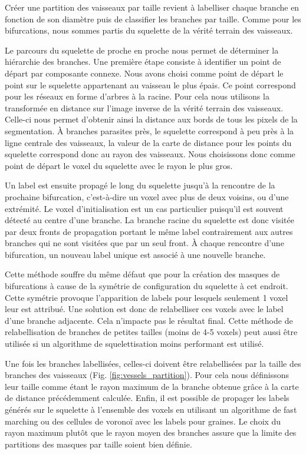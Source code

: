 Créer une partition des vaisseaux par taille revient à labelliser chaque branche en fonction de son diamètre puis de classifier les branches par taille. Comme pour les bifurcations, nous sommes partis du squelette de la vérité terrain des vaisseaux.

Le parcours du squelette de proche en proche nous permet de déterminer la hiérarchie des branches. Une première étape consiste à identifier un point de départ par composante connexe. Nous avons choisi comme point de départ le point sur le squelette appartenant au vaisseau le plus épais. Ce point correspond pour les réseaux en forme d'arbres à la racine. Pour cela nous utilisons la transformée en distance sur l'image inverse de la vérité terrain des vaisseaux. Celle-ci nous permet d'obtenir ainsi la distance aux bords de tous les pixels de la segmentation. À branches parasites près, le squelette correspond à peu près à la ligne centrale des vaisseaux, la valeur de la carte de distance pour les points du squelette correspond donc au rayon des vaisseaux. Nous choisissons donc comme point de départ le voxel du squelette avec le rayon le plus gros.

Un label est ensuite propagé le long du squelette jusqu'à la rencontre de la prochaine bifurcation, c'est-à-dire un voxel avec plus de deux voisins, ou d'une extrémité. Le voxel d'initialisation est un cas particulier puisqu'il est souvent détecté au centre d'une branche. La branche racine du squelette est donc visitée par deux fronts de propagation portant le même label contrairement aux autres branches qui ne sont visitées que par un seul front. À chaque rencontre d'une bifurcation, un nouveau label unique est associé à une nouvelle branche.

Cette méthode souffre du même défaut que pour la création des masques de bifurcations à cause de la symétrie de configuration du squelette à cet endroit. Cette symétrie provoque l'apparition de labels pour lesquels seulement 1 voxel leur est attribué. Une solution est donc de relabelliser ces voxels avec le label d'une branche adjacente. Cela n'impacte pas le résultat final. Cette méthode de relabellisation de branches de petites tailles (moins de 4-5 voxels) peut aussi être utilisée si un algorithme de squelettisation moins performant est utilisé.

Une fois les branches labellisées, celles-ci doivent être relabellisées par la taille des branches des vaisseaux (Fig. \ref{fig:vessels_partition}). Pour cela nous définissons leur taille comme étant le rayon maximum de la branche obtenue grâce à la carte de distance précédemment calculée. Enfin, il est possible de propager les labels générés sur le squelette à l'ensemble des voxels en utilisant un algorithme de fast marching ou des cellules de voronoï avec les labels pour graines. Le choix du rayon maximum plutôt que le rayon moyen des branches assure que la limite des partitions des masques par taille soient bien définie.

